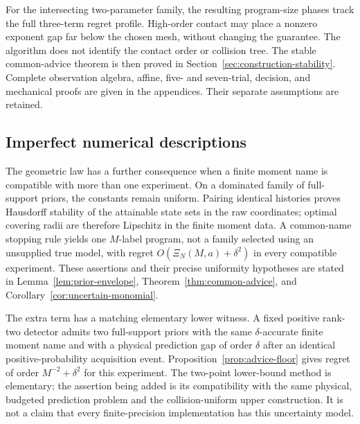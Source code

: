 For the intersecting two-parameter family, the resulting program-size
phases track the full three-term regret profile. High-order contact may
place a nonzero exponent gap far below the chosen mesh, without changing
the guarantee. The algorithm does not identify the contact order or
collision tree. The stable common-advice theorem is then proved in
Section~\ref{sec:construction-stability}. Complete observation
algebra, affine, five- and seven-trial, decision, and mechanical proofs
are given in the appendices. Their separate assumptions are retained.


\subsection{Imperfect numerical descriptions}
The geometric law has a further consequence when a finite moment name
is compatible with more than one experiment. On a dominated family of
full-support priors, the constants remain uniform. Pairing identical
histories proves Hausdorff stability of the attainable state sets in
the raw coordinates; optimal covering radii are therefore Lipschitz
in the finite moment data. A common-name stopping rule yields one
$M$-label program, not a family selected using an unsupplied true model,
with regret $O(\Xi_N(M,a)+\delta^2)$ in every compatible experiment.
These assertions and their precise uniformity hypotheses are stated
in Lemma~\ref{lem:prior-envelope},
Theorem~\ref{thm:common-advice}, and
Corollary~\ref{cor:uncertain-monomial}.

The extra term has a matching elementary lower witness. A fixed positive
rank-two detector admits two full-support priors with the same
$\delta$-accurate finite moment name and with a physical prediction gap
of order $\delta$ after an identical positive-probability acquisition
event. Proposition~\ref{prop:advice-floor} gives regret of order
$M^{-2}+\delta^2$ for this experiment. The two-point lower-bound method
is elementary; the assertion being added is its compatibility with the
same physical, budgeted prediction problem and the collision-uniform
upper construction. It is not a claim that every finite-precision
implementation has this uncertainty model.
